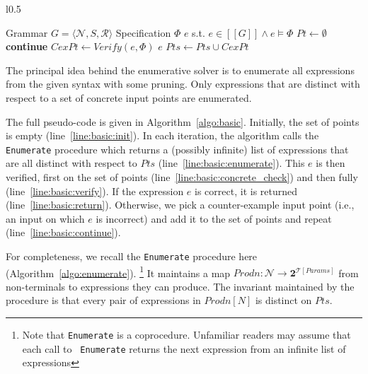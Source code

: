 \documentclass{llncs}
\newcommand\tuple[1]{\langle #1 \rangle}
\newcommand\True{\mathit{True}}
\newcommand\Points{\mathit{Pts}}
\newcommand\Point{\mathit{Pt}}
\newcommand\Verify{\mathit{Verify}}
\newcommand\CexInput{\mathit{CexPt}}
\newcommand\Expr{e}
\newcommand\Powerset[1]{\mathbf{2}^{#1}}
\newcommand\Spec{\Phi}
\newcommand\Grammar{G}
\newcommand\sem[1]{[\![ #1 ]\!]}
\newcommand\FormalParameters{\mathit{Params}}
\newcommand\Productions{\mathit{Prodn}}
\newcommand\NonTerminals{\mathcal{N}}
\newcommand\NonTerminal{N}
\newcommand\StartSymbol{S}
\newcommand\Rules{\mathcal{R}}
\newcommand\Theory{\mathcal{T}}
\begin{document}
\begin{wrapfigure}{l}{0.5\textwidth}
  \begin{minipage}{0.5\textwidth}
    \begin{algorithm}[H]
      \begin{algorithmic}[1]
        \Require Grammar $\Grammar = \tuple { \NonTerminals, \StartSymbol, \Rules }$
        \Require Specification $\Spec$
        \Ensure $\Expr$ s.t.  $\Expr \in \sem{\Grammar} \wedge \Expr \models \Spec$
        \State $\Point \gets \emptyset$ \label{line:basic:init}
        \While { $\True$ }
        \For {$\Expr \in \Call{Enumerate}{\Grammar,\Points}$ }\label{line:basic:enumerate}
        \If { $\Expr \models \Spec \downharpoonleft  \Points$ } \textbf{continue} \EndIf\label{line:basic:concrete_check}
        \State $\CexInput \gets \Verify(\Expr, \Spec)$ \label{line:basic:verify}
        \If { $\CexInput = \bot$ } \Return $\Expr$ \EndIf \label{line:basic:return}
        \State $\Points \gets \Points \cup \CexInput$ \label{line:basic:continue}
        \EndFor
        \EndWhile
      \end{algorithmic}
      \caption{Enumerative Solver}
      \label{algo:basic}
    \end{algorithm}
  \end{minipage}
\end{wrapfigure}
The principal idea behind the enumerative solver is to enumerate all
expressions from the given syntax with some pruning.
Only expressions that are distinct with respect to a set of concrete
input points are enumerated.

The full pseudo-code is given in Algorithm~\ref{algo:basic}.
Initially, the set of points is empty (line~\ref{line:basic:init}).
In each iteration, the algorithm calls the {\tt Enumerate} procedure
which returns a (possibly infinite) list of expressions that are all
distinct with respect to $\Points$ (line~\ref{line:basic:enumerate}).
This $\Expr$ is then verified, first on the set of points
(line~\ref{line:basic:concrete_check}) and then fully
(line~\ref{line:basic:verify}).
If the expression $\Expr$ is correct, it is returned
(line~\ref{line:basic:return}).
Otherwise, we pick a counter-example input point (i.e., an input on
which $\Expr$ is incorrect) and add it to the set of points and repeat
(line~\ref{line:basic:continue}).

For completeness, we recall the {\tt Enumerate} procedure here
(Algorithm~\ref{algo:enumerate}).
\footnote{Note that {\tt Enumerate} is a coprocedure.
  Unfamiliar readers may assume that each call to {\tt
  Enumerate} returns the next expression from an infinite list of
expressions}
It maintains a map $\Productions : \NonTerminals \to
\Powerset{\Theory[\FormalParameters]}$ from non-terminals to
expressions they can produce.
The invariant maintained by the procedure is that every pair of
expressions in $\Productions[\NonTerminal]$ is distinct on $\Points$.
\end{document}
